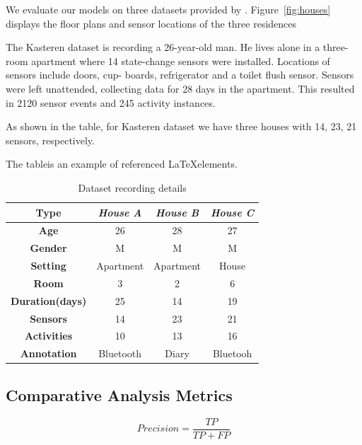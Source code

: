 We evaluate our models on three datasets provided by \cite{tvkasteren2010}.
Figure~\ref{fig:houses} displays the floor plans and sensor locations of the three residences 

The Kasteren dataset is recording a 26-year-old man. He lives alone in a three-room apartment where 14 state-change sensors were installed. Locations of sensors include doors, cup- boards, refrigerator and a toilet flush sensor. Sensors were left unattended, collecting data for 28 days in the apartment. This resulted in 2120 sensor events and 245 activity instances.

As shown in the table, for Kasteren dataset we have three houses with 14, 23, 21 sensors, respectively.

The tableis an example of referenced \LaTeX elements.
 
\begin{table}[t!]
\small
\begin{center}
\begin{tabular}{|c|c|c|c|}
\hline
\textbf{Type} & \emph{House A} & \emph{House B} & \emph{House C}\\ \hline
\textbf{Age} & 26 & 28 & 27\\ \hline
\textbf{Gender} & M & M & M\\ \hline
\textbf{Setting} & Apartment & Apartment & House\\ \hline
\textbf{Room} & 3 & 2 & 6\\ \hline
\textbf{Duration(days)} & 25 & 14 & 19\\ \hline
\textbf{Sensors} & 14 & 23 & 21\\ \hline
\textbf{Activities} & 10 & 13 & 16\\ \hline
\textbf{Annotation} & Bluetooth & Diary & Bluetooh\\ \hline
\end{tabular}
\end{center}
\caption{Dataset recording details}
\label{table:datasets}
\vspace{-0.3cm}
\end{table}




\subsection{Comparative Analysis Metrics}

\begin{equation}
Precision = \frac{TP}{TP+FP}
\end{equation}

